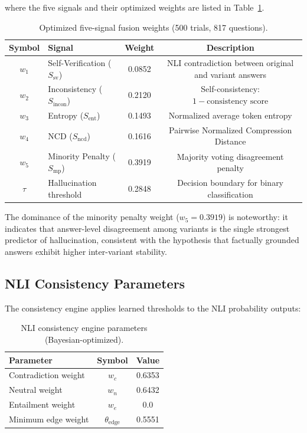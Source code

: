 \noindent where the five signals and their optimized weights are listed in Table~\ref{tab:fusion-weights}.

\begin{table}[!htbp]
    \centering
    \caption{Optimized five-signal fusion weights (500 trials, 817 questions).}
    \label{tab:fusion-weights}
    \begin{tabular}{clcc}
        \toprule
        \textbf{Symbol} & \textbf{Signal} & \textbf{Weight} & \textbf{Description} \\
        \midrule
        $w_1$ & Self-Verification ($S_{\text{sv}}$)       & 0.0852 & NLI contradiction between original and variant answers \\
        $w_2$ & Inconsistency ($S_{\text{incon}}$)        & 0.2120 & Self-consistency: $1 - \text{consistency score}$ \\
        $w_3$ & Entropy ($S_{\text{ent}}$)                & 0.1493 & Normalized average token entropy \\
        $w_4$ & NCD ($S_{\text{ncd}}$)                    & 0.1616 & Pairwise Normalized Compression Distance \\
        $w_5$ & Minority Penalty ($S_{\text{mp}}$)        & 0.3919 & Majority voting disagreement penalty \\
        \midrule
        $\tau$ & Hallucination threshold                   & 0.2848 & Decision boundary for binary classification \\
        \bottomrule
    \end{tabular}
\end{table}

The dominance of the minority penalty weight ($w_5 = 0.3919$) is noteworthy: it indicates that answer-level disagreement among variants is the single strongest predictor of hallucination, consistent with the hypothesis that factually grounded answers exhibit higher inter-variant stability.

\subsection{NLI Consistency Parameters}

The consistency engine applies learned thresholds to the NLI probability outputs:

\begin{table}[!htbp]
    \centering
    \caption{NLI consistency engine parameters (Bayesian-optimized).}
    \label{tab:nli-params}
    \begin{tabular}{lcc}
        \toprule
        \textbf{Parameter} & \textbf{Symbol} & \textbf{Value} \\
        \midrule
        Contradiction weight    & $w_c$ & 0.6353 \\
        Neutral weight          & $w_n$ & 0.6432 \\
        Entailment weight       & $w_e$ & 0.0    \\
        Minimum edge weight     & $\theta_{\text{edge}}$ & 0.5551 \\
        \bottomrule
    \end{tabular}
\end{table}

